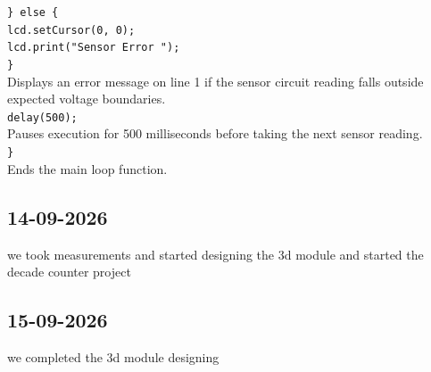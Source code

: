 \documentclass[12pt, a4paper]{article}
\begin{document}
	\noindent\texttt{\} else \{}\\
	\hspace*{1em}\texttt{lcd.setCursor(0, 0);}\\
	\hspace*{1em}\texttt{lcd.print("Sensor Error   ");}\\
	\texttt{\}}\\
	Displays an error message on line 1 if the sensor circuit reading falls outside expected voltage boundaries.
	\\[6pt]
	
	\noindent\texttt{delay(500);}\\
	Pauses execution for 500 milliseconds before taking the next sensor reading.
	\\[6pt]
	
	\noindent\texttt{\}}\\
	Ends the main loop function.
	\subsection{14-09-2026} we took measurements and started designing the 3d module and started the decade counter project
	\subsection{15-09-2026}we completed the 3d module designing
	
	
\end{document}
